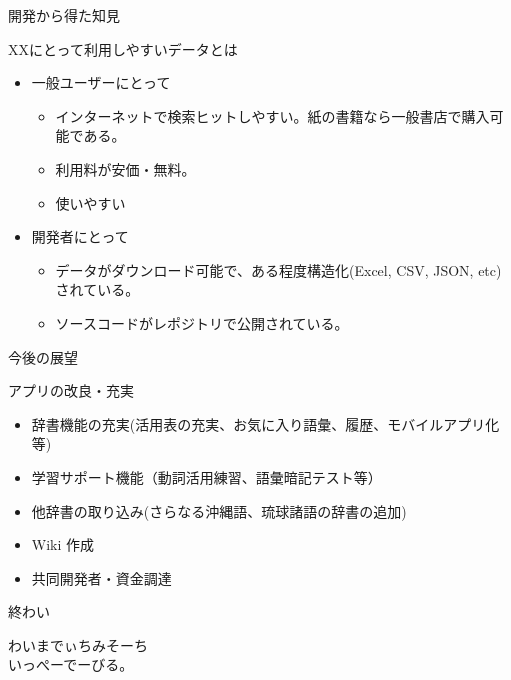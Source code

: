 \documentclass[14pt]{beamer}
\begin{document}
\begin{frame}{開発から得た知見}
  \begin{block}{XXにとって利用しやすいデータとは}
    \begin{itemize}
    \item 一般ユーザーにとって
      \begin{itemize}
      \item インターネットで検索ヒットしやすい。紙の書籍なら一般書店で購入可能である。
      \item 利用料が安価・無料。
      \item 使いやすい
      \end{itemize}
    \item 開発者にとって
      \begin{itemize}
      \item データがダウンロード可能で、ある程度構造化(Excel, CSV, JSON, etc)されている。
      \item ソースコードがレポジトリで公開されている。
      \end{itemize}
    \end{itemize}
  \end{block}
\end{frame}
\begin{frame}{今後の展望}
  \begin{block}{アプリの改良・充実}
    \begin{itemize}
    \item 辞書機能の充実(活用表の充実、お気に入り語彙、履歴、モバイルアプリ化等)
    \item 学習サポート機能（動詞活用練習、語彙暗記テスト等）
    \item 他辞書の取り込み(さらなる沖縄語、琉球諸語の辞書の追加)
    \item Wiki 作成
    \item 共同開発者・資金調達
    \end{itemize}
  \end{block}
\end{frame}
\begin{frame}{終わい}
  \begin{center}
  \LARGE{わいまでぃちみそーち\\いっぺーでーびる。}
  \end{center}
\end{frame}
\end{document}
